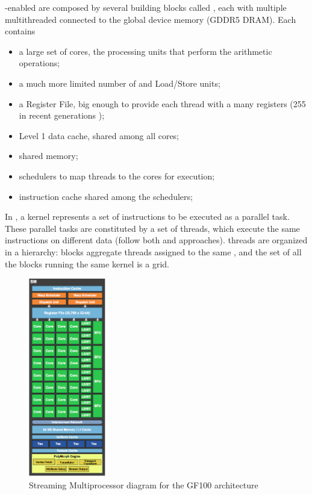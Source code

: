 \documentclass[../thesis]{subfiles}
\begin{document}
	\cuda-enabled \gpus are composed by several building blocks called \gpcs, each with multiple multithreaded \sms connected to the global device memory (GDDR5 DRAM). Each \sm contains
	\begin{itemize}
		\item a large set of \cuda cores, the processing units that perform the arithmetic operations;
		\item a much more limited number of \sfus and Load/Store units;
		\item a Register File, big enough to provide each thread with a many registers (255 in recent generations \cite{NVIDIA:KEPLER});
		\item Level 1 data cache, shared among all cores;
		\item shared memory;
		\item schedulers to map threads to the cores for execution;
		\item instruction cache shared among the schedulers;
	\end{itemize}

	In \cuda, a kernel represents a set of instructions to be executed as a parallel task. These parallel tasks are constituted by a set of \cuda threads, which execute the same instructions on different data (follow both \simd and \simt approaches). \cuda threads are organized in a hierarchy: blocks aggregate threads assigned to the same \sm, and the set of all the blocks running the same kernel is a grid.

	\begin{figure}
		\centering
		\includegraphics[width=0.3\textwidth]{assets/images/cuda/arch/sm.png}
		\captionsetup{font=small}
		\caption{Streaming Multiprocessor diagram for the GF100 architecture}
		\label{fig:gf100}
	\end{figure}
\end{document}
